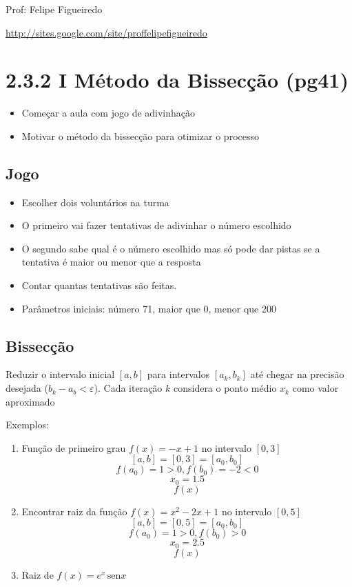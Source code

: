 \documentclass[a4paper]{article}
\providecommand{\sin}{} \renewcommand{\sin}{\hspace{2pt}\mathrm{sen}}
\begin{document}
\parbox[c]{.825\textwidth}{\raggedright%
{Prof: Felipe Figueiredo\par}
{\url{http://sites.google.com/site/proffelipefigueiredo}}

\vspace{1cm}
}


\section*{2.3.2 I Método da Bissecção (pg41)}

\begin{itemize}
\item Começar a aula com jogo de adivinhação
\item Motivar o método da bissecção para otimizar o processo
\end{itemize}

\subsection*{Jogo}

\begin{itemize}
\item Escolher dois voluntários na turma
\item O primeiro vai fazer tentativas de adivinhar o número escolhido
\item O segundo sabe qual é o número escolhido mas só pode dar pistas
  se a tentativa é maior ou menor que a resposta
\item Contar quantas tentativas são feitas.
\item Parâmetros iniciais: número 71, maior que 0, menor que 200
\end{itemize}

\subsection*{Bissecção}

Reduzir o intervalo inicial $[a,b]$ para intervalos $[a_k,b_k]$ até
chegar na precisão desejada ($b_k - a_b < \varepsilon$). Cada iteração
$k$ considera o ponto médio $x_k$ como valor aproximado


Exemplos: 

\begin{enumerate}
\item Função de primeiro grau $f(x) = -x+1$ no intervalo $[0,3]$
  $$[a,b]=[0,3]=[a_0,b_0]$$
  $$f(a_0)=1>0, f(b_0)=-2<0$$
  $$x_0 = 1.5$$
  $$f(x)$$


\item Encontrar raiz da função $f(x) = x^2 - 2x +1$ no intervalo $[0,5]$
  $$[a,b]=[0,5]=[a_0,b_0]$$
  $$f(a_0)=1>0, f(b_0)>0$$
  $$x_0 = 2.5$$
  $$f(x)$$

\item Raiz de $f(x) = e^x \sin{x} $

\end{enumerate}
\end{document}
